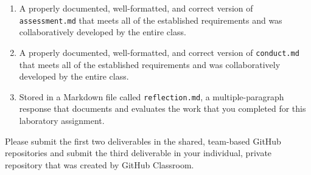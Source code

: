 \documentclass[11pt]{article}
\newcommand{\assessment}{\lstinline{assessment.md}}
\newcommand{\conduct}{\lstinline{conduct.md}}
\newcommand{\reflection}{\lstinline{reflection.md}}
\begin{document}
\begin{enumerate}

\setlength{\itemsep}{-.01in}

\item A properly documented, well-formatted, and correct version of
  \assessment{} that meets all of the established requirements and was
  collaboratively developed by the entire class.

\item A properly documented, well-formatted, and correct version of
  \conduct{} that meets all of the established requirements and was
  collaboratively developed by the entire class.

\item Stored in a Markdown file called \reflection{}, a multiple-paragraph
  response that documents and evaluates the work that you completed for this
  laboratory assignment.

\end{enumerate}

\noindent Please submit the first two deliverables in the shared, team-based
GitHub repositories and submit the third deliverable in your individual, private
repository that was created by GitHub Classroom.
\end{document}
